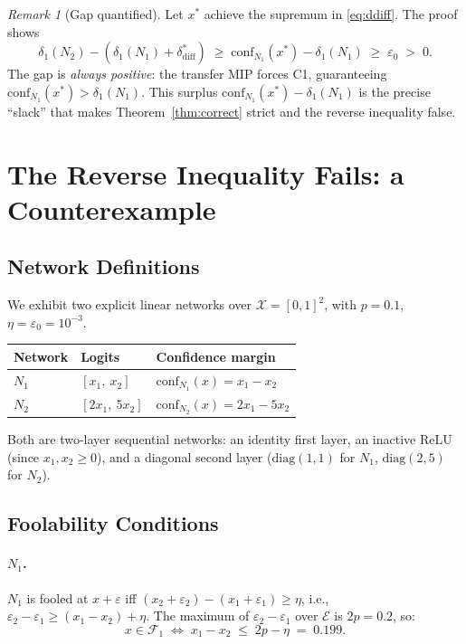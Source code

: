 \documentclass[12pt]{article}
\theoremstyle{definition}
\theoremstyle{plain}
\theoremstyle{remark}
\newtheorem{remark}{Remark}[section]
\newcommand{\conf}[2]{\mathrm{conf}_{#1}(#2)}
\newcommand{\dN}[1]{\delta_1(N_{#1})}
\newcommand{\ddiff}{\delta_{\mathrm{diff}}^{*}}
\newcommand{\Xdom}{\mathcal{X}}
\newcommand{\Edom}{\mathcal{E}}
\newcommand{\Ffool}[1]{\mathcal{F}_{#1}}
\begin{document}
\begin{remark}[Gap quantified]\label{rem:gap}
Let $x^*$ achieve the supremum in \eqref{eq:ddiff}.
The proof shows
\[
  \dN{2} - (\dN{1}+\ddiff)
  \;\geq\;
  \conf{N_1}{x^*}-\dN{1}
  \;\geq\;\varepsilon_0\;>\;0.
\]
The gap is \emph{always positive}: the transfer MIP forces C1,
guaranteeing $\conf{N_1}{x^*}>\dN{1}$. This surplus
$\conf{N_1}{x^*}-\dN{1}$ is the precise ``slack'' that makes
Theorem~\ref{thm:correct} strict and the reverse inequality false.
\end{remark}

\section{The Reverse Inequality Fails: a Counterexample}\label{sec:counter}

\subsection{Network Definitions}

We exhibit two explicit linear networks over $\Xdom=[0,1]^2$,
with $p=0.1$, $\eta=\varepsilon_0=10^{-3}$.

\medskip
\begin{center}
\begin{tabular}{lll}
\toprule
Network & Logits & Confidence margin \\
\midrule
$N_1$ & $[x_1,\ x_2]$ & $\conf{N_1}{x}=x_1-x_2$ \\[4pt]
$N_2$ & $[2x_1,\ 5x_2]$ & $\conf{N_2}{x}=2x_1-5x_2$ \\
\bottomrule
\end{tabular}
\end{center}

\medskip\noindent
Both are two-layer sequential networks: an identity first layer,
an inactive ReLU (since $x_1,x_2\geq 0$), and a diagonal second layer
($\mathrm{diag}(1,1)$ for $N_1$, $\mathrm{diag}(2,5)$ for $N_2$).

\subsection{Foolability Conditions}

\paragraph{$N_1$.}
$N_1$ is fooled at $x+\varepsilon$ iff
$(x_2+\varepsilon_2)-(x_1+\varepsilon_1)\geq\eta$,
i.e., $\varepsilon_2-\varepsilon_1\geq(x_1-x_2)+\eta$.
The maximum of $\varepsilon_2-\varepsilon_1$ over $\Edom$ is $2p=0.2$, so:
\[
  x\in\Ffool{1}
  \;\Longleftrightarrow\;
  x_1-x_2\;\leq\;2p-\eta\;=\;0.199.
\]
\end{document}
